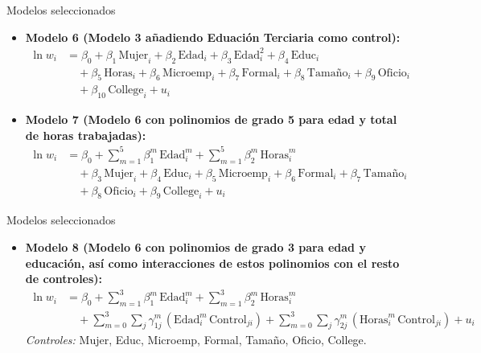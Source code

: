 \documentclass[11pt]{beamer}
\begin{document}
\begin{frame}{Modelos seleccionados}
\begin{itemize}

\item \textbf{Modelo 6 (Modelo 3 añadiendo Eduación Terciaria como control):}
{\small
\[
\begin{aligned}
\ln w_{i} &= \beta_{0} 
+ \beta_{1}\,\text{Mujer}_{i}
+ \beta_{2}\,\text{Edad}_{i}
+ \beta_{3}\,\text{Edad}_{i}^{2}
+ \beta_{4}\,\text{Educ}_{i}
\\&\quad
+ \beta_{5}\,\text{Horas}_{i}
+ \beta_{6}\,\text{Microemp}_{i}
+ \beta_{7}\,\text{Formal}_{i}
+ \beta_{8}\,\text{Tamaño}_{i}
+ \beta_{9}\,\text{Oficio}_{i}
\\&\quad
+ \beta_{10}\,\text{College}_{i}
+ u_{i}
\end{aligned}
\]
}

\item \textbf{Modelo 7 (Modelo 6 con polinomios de grado 5 para edad y total de horas trabajadas):}
{\small
\[
\begin{aligned}
\ln w_{i} &= \beta_{0} 
+ \sum_{m=1}^{5} \beta_{1}^{m}\,\text{Edad}_{i}^{m}
+ \sum_{m=1}^{5} \beta_{2}^{m}\,\text{Horas}_{i}^{m}
\\&\quad
+ \beta_{3}\,\text{Mujer}_{i}
+ \beta_{4}\,\text{Educ}_{i}
+ \beta_{5}\,\text{Microemp}_{i}
+ \beta_{6}\,\text{Formal}_{i}
+ \beta_{7}\,\text{Tamaño}_{i}
\\&\quad
+ \beta_{8}\,\text{Oficio}_{i}
+ \beta_{9}\,\text{College}_{i}
+ u_{i}
\end{aligned}
\]
}
  \end{itemize}  
\end{frame}

\begin{frame}{Modelos seleccionados}
\begin{itemize}

\item \textbf{Modelo 8 (Modelo 6 con polinomios de grado 3 para edad y educación, así como interacciones de estos polinomios con el resto de controles):}
{\small
\[
\begin{aligned}
\ln w_{i} &= \beta_{0} 
+ \sum_{m=1}^{3} \beta_{1}^{m}\,\text{Edad}_{i}^{m}
+ \sum_{m=1}^{3} \beta_{2}^{m}\,\text{Horas}_{i}^{m}
\\&\quad
+ \sum_{m=0}^{3}\sum_{j} \gamma_{1j}^{m}\,(\text{Edad}_{i}^{m}\,\text{Control}_{ji})
+ \sum_{m=0}^{3}\sum_{j} \gamma_{2j}^{m}\,(\text{Horas}_{i}^{m}\,\text{Control}_{ji})
+ u_{i}
\end{aligned}
\]
}
\emph{Controles:} Mujer, Educ, Microemp, Formal, Tamaño, Oficio, College.

\end{itemize}
    
\end{frame}
\end{document}
